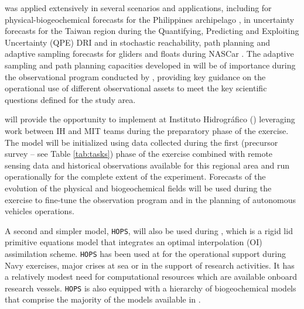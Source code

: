 \mse was applied extensively in several scenarios and applications,
including for physical-biogeochemical forecasts for the Philippines
archipelago \cite{lermusiaux11}, in uncertainty forecasts for the
Taiwan region during the Quantifying, Predicting and Exploiting
Uncertainty (QPE) DRI \cite{gawarkiewicz11} and in stochastic
reachability, path planning and adaptive sampling forecasts for
gliders and floats during NASCar \cite{lermusiaux17}. The adaptive
sampling and path planning capacities developed in \mse will be of
importance during the observational program conducted by \proje,
providing key guidance on the operational use of different
observational assets to meet the key scientific questions defined for
the study area.


\proj will provide the opportunity to implement \mse at Instituto
Hidrogr\'{a}fico (\inste) leveraging work between IH and MIT teams
during the preparatory phase of the exercise. The model will be
initialized using data collected during the first (precursor survey --
see Table \ref{tab:tasks}) phase of the exercise combined with remote
sensing data and historical observations available for this regional
area and run operationally for the complete extent of the
experiment. Forecasts of the evolution of the physical and
biogeochemical fields will be used during the exercise to fine-tune
the observation program and in the planning of autonomous vehicles
operations. 

A second and simpler model, \texttt{HOPS}, will also be used during
\proje, which is a rigid lid primitive equations model that integrates
an optimal interpolation (OI) assimilation scheme. \texttt{HOPS} has
been used at \inst for the operational support during Navy exercises,
major crises at sea or in the support of research activities. It has a
relatively modest need for computational resources which are available
onboard research vessels. \texttt{HOPS} is also equipped with a
hierarchy of biogeochemical models that comprise the majority of the
models available in \msee.

